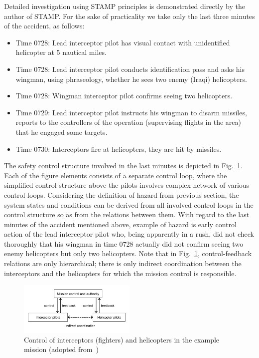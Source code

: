 \documentclass[sw]{iosart2x}
\begin{document}
Detailed investigation using STAMP principles is demonstrated directly by the author of STAMP. For the sake of practicality we take only the last three minutes of the accident, as follows:
\begin{itemize}
  \item Time 0728: Lead interceptor pilot has visual contact with unidentified helicopter at 5 nautical miles.
  \item Time 0728: Lead interceptor pilot conducts identification pass and asks his wingman, using phraseology, whether he sees two enemy (Iraqi) helicopters.
  \item Time 0728: Wingman interceptor pilot confirms seeing two helicopters.
  \item Time 0729: Lead interceptor pilot instructs his wingman to disarm missiles, reports to the controllers of the operation (supervising flights in the area) that he engaged some targets.
  \item Time 0730: Interceptors fire at helicopters, they are hit by missiles.
\end{itemize}

The safety control structure involved in the last minutes is depicted in Fig.~\ref{fig:example}. Each of the figure elements consists of a separate control loop, where the simplified control structure above the pilots involves complex network of various control loops. Considering the definition of hazard from previous section, the system states and conditions can be derived from all involved control loops in the control structure so as from the relations between them. With regard to the last minutes of the accident mentioned above, example of hazard is early control action of the lead interceptor pilot who, being apparently in a rush, did not check thoroughly that his wingman in time 0728 actually did not confirm seeing two enemy helicopters but only two helicopters. Note that in Fig.~\ref{fig:example}, control-feedback relations are only hierarchical; there is only indirect coordination between the interceptors and the helicopters for which the mission control is responsible.

\begin{figure}[b]
\begin{center}
\includegraphics[width=0.5\textwidth]{images/Fig_Example.pdf}
\end{center}
\caption{Control of interceptors (fighters) and helicopters in the example mission (adopted from~\cite{leveson2012engineering})}
\label{fig:example}
\end{figure}
\end{document}
